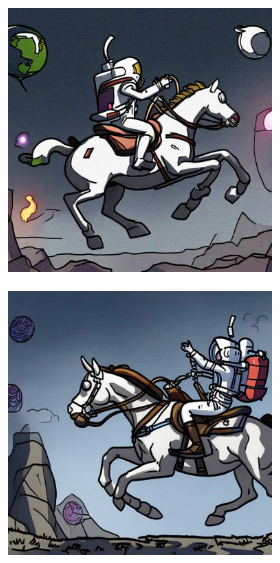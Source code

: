 \documentclass{article}
\begin{document}
\begin{figure}[h]
\begin{subfigure}[t]{\textwidth}
\begin{subfigure}[b]{0.19\textwidth}
         \includegraphics[width=\textwidth]{plots/process/generations/antidb/gaussian.jpeg}
     \end{subfigure}
     \hfill
     \begin{subfigure}[b]{0.19\textwidth}
         \centering

         \includegraphics[width=\textwidth]{plots/process/generations/antidb/diffpure.jpeg}
     \end{subfigure}
     \hfill
     \begin{subfigure}[b]{0.19\textwidth}
         \centering


\end{subfigure}
\end{subfigure}
\end{figure}
\end{document}
